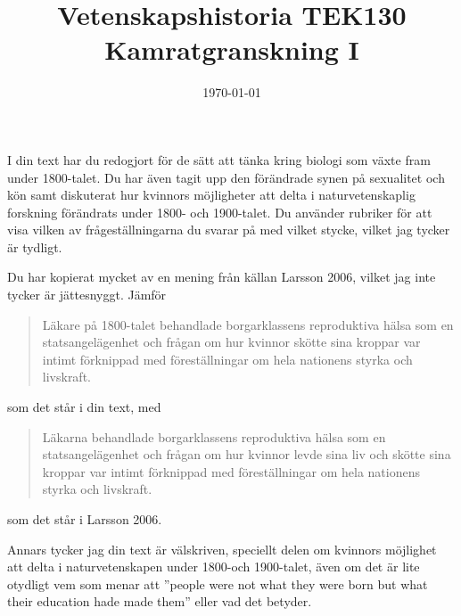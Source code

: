 \documentclass[a4paper, 11pt]{article}
\title{Vetenskapshistoria TEK130\\ Kamratgranskning I}
\author{}
\date{\today}
\begin{document}
\maketitle


I din text har du redogjort för de sätt att tänka kring biologi som växte fram under 1800-talet. Du har även tagit upp den förändrade synen på sexualitet och kön samt diskuterat hur kvinnors möjligheter att delta i naturvetenskaplig forskning förändrats under 1800- och 1900-talet. Du använder rubriker för att visa vilken av frågeställningarna du svarar på med vilket stycke, vilket jag tycker är tydligt.

Du har kopierat mycket av en mening från källan Larsson 2006, vilket jag inte tycker är jättesnyggt. Jämför
\begin{quote}
	Läkare på 1800-talet behandlade borgarklassens reproduktiva hälsa som en statsangelägenhet och frågan om hur kvinnor skötte sina kroppar var intimt förknippad med föreställningar om hela nationens styrka och livskraft.
\end{quote}
som det står i din text, med
\begin{quote}
	Läkarna behandlade borgarklassens reproduktiva hälsa som en statsangelägenhet och frågan om hur kvinnor levde sina liv och skötte sina kroppar var intimt förknippad med föreställningar om hela nationens styrka och livskraft.
\end{quote}
som det står i Larsson 2006.

Annars tycker jag din text är välskriven, speciellt delen om kvinnors möjlighet att delta i naturvetenskapen under 1800-och 1900-talet, även om det är lite otydligt vem som menar att ''people were not what they were born but what their education hade made them'' eller vad det betyder.


%
%
\end{document}
